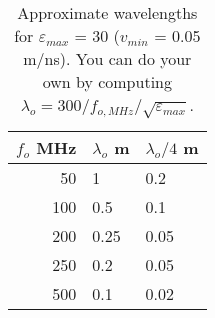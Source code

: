 \documentclass[a4paper,12pt]{article}
\begin{document}
%
%
%
\begin{table}[!h]
\centering
\begin{tabular}{ r | l | l}
$f_o$ MHz & $\lambda_o$ m & $\lambda_o/4$ m \\
\hline
50 & 1 & 0.2 \\
100 & 0.5 & 0.1 \\
200 & 0.25 & 0.05 \\
250 & 0.2 & 0.05 \\
500 & 0.1 & 0.02 \\
\hline
\end{tabular}
\caption{Approximate wavelengths for $\varepsilon_{max}$ = 30 ($v_{min}$ = 0.05 m/ns). You can do your own by computing $\lambda_o=300/f_{o,MHz}/\sqrt{\varepsilon_{max}}$.}
 \label{tbl:wavelength}
 \end{table}
%
%


\end{document}
